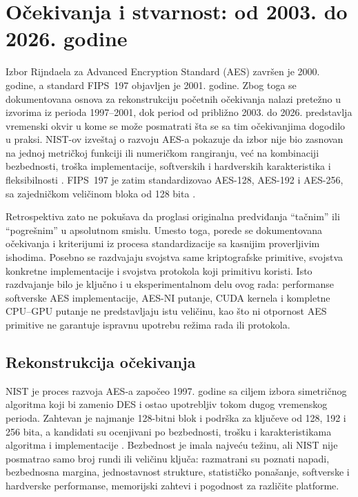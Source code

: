 \section{Očekivanja i stvarnost: od 2003. do 2026. godine}
\label{sec:retrospektiva}

Izbor Rijndaela za Advanced Encryption Standard (AES) završen je 2000.
godine, a standard FIPS~197 objavljen je 2001. godine. Zbog toga se
dokumentovana osnova za rekonstrukciju početnih očekivanja nalazi pretežno
u izvorima iz perioda 1997--2001, dok period od približno 2003. do 2026.
predstavlja vremenski okvir u kome se može posmatrati šta se sa tim
očekivanjima dogodilo u praksi. NIST-ov izveštaj o razvoju AES-a pokazuje
da izbor nije bio zasnovan na jednoj metričkoj funkciji ili numeričkom
rangiranju, već na kombinaciji bezbednosti, troška implementacije,
softverskih i hardverskih karakteristika i fleksibilnosti
\cite{nechvatal2001aes}. FIPS~197 je zatim standardizovao AES-128,
AES-192 i AES-256, sa zajedničkom veličinom bloka od 128 bita
\cite{nist_fips197_2001,nist_fips197_2023}.

Retrospektiva zato ne pokušava da proglasi originalna predviđanja
``tačnim'' ili ``pogrešnim'' u apsolutnom smislu. Umesto toga, porede se
dokumentovana očekivanja i kriterijumi iz procesa standardizacije sa
kasnijim proverljivim ishodima. Posebno se razdvajaju svojstva same
kriptografske primitive, svojstva konkretne implementacije i svojstva
protokola koji primitivu koristi. Isto razdvajanje bilo je ključno i u
eksperimentalnom delu ovog rada: performanse softverske AES implementacije,
AES-NI putanje, CUDA kernela i kompletne CPU--GPU putanje ne predstavljaju
istu veličinu, kao što ni otpornost AES primitive ne garantuje ispravnu
upotrebu režima rada ili protokola.

\subsection{Rekonstrukcija očekivanja}

NIST je proces razvoja AES-a započeo 1997. godine sa ciljem izbora
simetričnog algoritma koji bi zamenio DES i ostao upotrebljiv tokom
dugog vremenskog perioda. Zahtevan je najmanje 128-bitni blok i podrška
za ključeve od 128, 192 i 256 bita, a kandidati su ocenjivani po
bezbednosti, trošku i karakteristikama algoritma i implementacije
\cite{nechvatal2001aes}. Bezbednost je imala najveću težinu, ali NIST
nije posmatrao samo broj rundi ili veličinu ključa: razmatrani su poznati
napadi, bezbednosna margina, jednostavnost strukture, statističko
ponašanje, softverske i hardverske performanse, memorijski zahtevi i
pogodnost za različite platforme.


